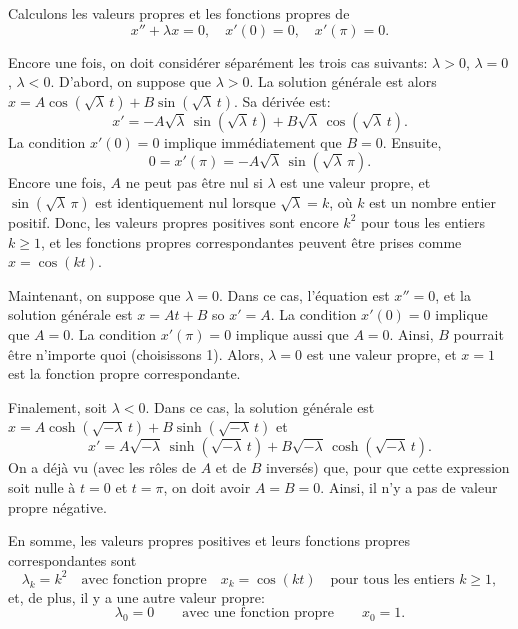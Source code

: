 \begin{example}
Calculons les valeurs propres et les fonctions propres de 
\begin{equation*}
x'' + \lambda x = 0, \quad x'(0) = 0, \quad x'(\pi) = 0 .
\end{equation*}

Encore une fois, on doit considérer séparément  les trois cas suivants: $\lambda > 0$, $\lambda = 0$, $\lambda
< 0$.
D'abord, on suppose que $\lambda > 0$.
La solution générale est alors 
$x = A \cos ( \sqrt{\lambda}\, t) + B \sin ( \sqrt{\lambda}\, t)$.  Sa dérivée est: 
\begin{equation*}
x' = -A\sqrt{\lambda}\, \sin ( \sqrt{\lambda}\, t) + B\sqrt{\lambda}\,
\cos (\sqrt{\lambda}\, t) .
\end{equation*}
La condition $x'(0) = 0$ implique immédiatement que  $B = 0$.
Ensuite,
\begin{equation*}
0 = x'(\pi) = -A\sqrt{\lambda}\, \sin ( \sqrt{\lambda}\, \pi) .
\end{equation*}
Encore une fois,  $A$ ne peut pas être nul si  $\lambda$ est une valeur propre, et $\sin ( \sqrt{\lambda}\, \pi)$ est identiquement nul lorsque
$\sqrt{\lambda} = k$,  où $k$ est un nombre entier positif.
Donc, les valeurs propres positives sont encore 
$k^2$ pour tous les entiers $k \geq 1$, et les fonctions propres correspondantes peuvent être prises comme  $x=\cos (k t)$.

Maintenant, on suppose que  $\lambda = 0$.  Dans ce cas, l'équation est $x'' = 0$,
et la solution générale est $x = At + B$ so $x' = A$.  La condition 
$x'(0) = 0$ implique que 
$A=0$.  La condition $x'(\pi) = 0$ implique aussi que  $A=0$.
Ainsi, $B$ pourrait être n'importe quoi (choisissons 1). Alors, $\lambda = 0$
est une valeur propre, et $x=1$ est la fonction propre correspondante. 

Finalement, soit $\lambda < 0$.  Dans ce cas, la solution générale est 
$x = A \cosh ( \sqrt{-\lambda}\, t) + B \sinh ( \sqrt{-\lambda}\, t)$
et
\begin{equation*}
x' = A\sqrt{-\lambda}\, \sinh ( \sqrt{-\lambda}\, t)
+ B\sqrt{-\lambda}\, \cosh ( \sqrt{-\lambda}\, t ) .
\end{equation*}
On a déjà vu (avec les rôles de  $A$ et de $B$ inversés) que, pour que cette expression soit  nulle à $t=0$ et $t=\pi$, on doit avoir $A=B=0$. Ainsi, il n'y a pas de valeur propre négative. 

En somme, les valeurs propres positives et leurs fonctions propres correspondantes sont
\begin{equation*}
\lambda_k = k^2 \quad \text{avec fonction propre} \quad x_k = \cos (k t)
\quad \text{pour tous les entiers } k \geq 1 ,
\end{equation*}
et, de plus, il y a une autre valeur propre: 
\begin{equation*}
\lambda_0 = 0 \qquad \text{avec une fonction propre} \qquad x_0 = 1.
\end{equation*}
\end{example}

